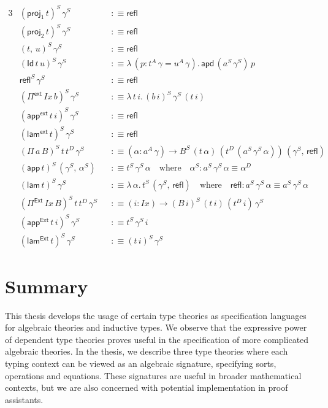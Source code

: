 \documentclass[12pt,a4paper,twoside,openany]{book}
\theoremstyle{remark}
\theoremstyle{definition}
\theoremstyle{theorem}
\newcommand{\mi}[1]{\mathit{#1}}
\newcommand{\ms}[1]{\mathsf{#1}}
\newcommand{\apd}{\ms{apd}}
\newcommand{\refl}{\mathsf{refl}}
\newcommand{\Id}{\mathsf{Id}}
\newcommand{\proj}{\mathsf{proj}}
\newcommand{\Pie}{\Pi^{\mathsf{Ext}}}
\newcommand{\appe}{\mathsf{app^{Ext}}}
\newcommand{\lame}{\mathsf{lam^{Ext}}}
\newcommand{\Piinf}{\Pi^{\mathsf{ext}}}
\newcommand{\appinf}{\mathsf{app^{ext}}}
\newcommand{\laminf}{\mathsf{lam^{ext}}}
\newcommand{\app}{\ms{app}}
\newcommand{\lam}{\ms{lam}}
\newcommand{\defn}{:\equiv}
\begin{document}
\begin{alignat*}{3}
  &(\proj_1\,t)^S\,\gamma^S &&\defn \refl\\
  &(\proj_2\,t)^S\,\gamma^S &&\defn \refl\\
  &(t,\,u)^S\,\gamma^S &&\defn \refl \\
  &(\Id\,t\,u)^S\,\gamma^S &&\defn \lambda\,(p : t^A\,\gamma = u^A\,\gamma).\,\apd\,(a^S\,\gamma^S)\,p\\
  &\refl^S\,\gamma^S &&\defn \refl\\
  &(\Piinf\,\mi{Ix}\,b)^S\,\gamma^S &&\defn \lambda\,t\,i.\,(b\,i)^S\,\gamma^S\,(t\,i)\\
  &(\appinf\,t\,i)^S\,\gamma^S &&\defn \refl \\
  &(\laminf\,t)^S\,\gamma^S &&\defn \refl \\
  &(\Pi\,a\,B)^S\,t\,t^D\,\gamma^S &&\defn (\alpha : a^A\,\gamma) \to B^S\,(t\,\alpha)\,(t^D\,(a^S\,\gamma^S\,\alpha))\,(\gamma^S,\,\refl)\\
  &(\app\,t)^S\,(\gamma^S,\,\alpha^S) &&\defn t^S\,\gamma^S\,\alpha\hspace{1em}\text{where}\hspace{1em} \alpha^S : a^S\,\gamma^S\,\alpha \equiv \alpha^D\\
  &(\lam\,t)^S\,\gamma^S &&\defn \lambda\,\alpha.\,t^S\,(\gamma^S,\,\refl)\hspace{1em}\text{where}\hspace{1em} \refl : a^S\,\gamma^S\,\alpha \equiv a^S\,\gamma^S\,\alpha\\
  &(\Pie\,\mi{Ix}\,B)^S\,t\,t^D\,\gamma^S &&\defn (i : \mi{Ix}) \to (B\,i)^S\,(t\,i)\,(t^D\,i)\,\gamma^S\\
  &(\appe\,t\,i)^S\,\gamma^S &&\defn t^S\,\gamma^S\,i\\
  &(\lame\,t)^S\,\gamma^S &&\defn (t\,i)^S\,\gamma^S
\end{alignat*}

\backmatter


\pagebreak
\section*{Summary}

This thesis develops the usage of certain type theories as specification
languages for algebraic theories and inductive types. We observe that the
expressive power of dependent type theories proves useful in the specification
of more complicated algebraic theories. In the thesis, we describe three type
theories where each typing context can be viewed as an algebraic signature,
specifying sorts, operations and equations. These signatures are useful in
broader mathematical contexts, but we are also concerned with potential
implementation in proof assistants.
\end{document}
